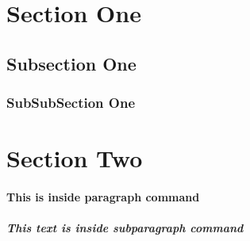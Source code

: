 \documentclass{article}
\begin{document}
\tableofcontents
\section{Section One}
\subsection{Subsection One}
\subsubsection{SubSubSection One}
\section{Section Two}
\paragraph{This is inside paragraph command}
\subparagraph{This text is inside subparagraph command}
\end{document}
